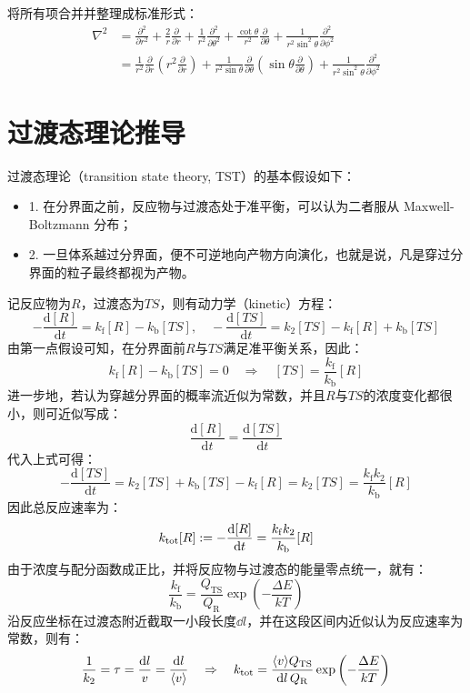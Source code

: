 将所有项合并并整理成标准形式：
\[\begin{aligned}
\nabla^2 &= \frac{\partial^2}{\partial r^2} + \frac{2}{r}\frac{\partial}{\partial r} + \frac{1}{r^2}\frac{\partial^2}{\partial\theta^2} + \frac{\cot\theta}{r^2}\frac{\partial}{\partial\theta} + \frac{1}{r^2\sin^2\theta}\frac{\partial^2}{\partial\phi^2}\\
&= \frac{1}{r^2}\frac{\partial}{\partial r}\left(r^2\frac{\partial}{\partial r}\right) + \frac{1}{r^2\sin\theta}\frac{\partial}{\partial\theta}\left(\sin\theta\frac{\partial}{\partial\theta}\right) + \frac{1}{r^2\sin^2\theta}\frac{\partial^2}{\partial\phi^2}
\end{aligned}\]

\newpage
\section{过渡态理论推导}\label{sec:tst}
过渡态理论（transition state theory, TST）的基本假设如下：
\begin{itemize}
    \item 1. 在分界面之前，反应物与过渡态处于准平衡，可以认为二者服从 Maxwell-Boltzmann 分布；
    \item 2. 一旦体系越过分界面，便不可逆地向产物方向演化，也就是说，凡是穿过分界面的粒子最终都视为产物。
\end{itemize}
记反应物为$R$，过渡态为$TS$，则有动力学（kinetic）方程：
\[-\frac{\mathrm{d} {[R]}}{\mathrm{d} t} = k_{\mathrm{f}}[R]-k_{\mathrm{b}}[TS], \quad -\frac{\mathrm{d} {[TS]}}{\mathrm{d} t} = k_2[TS]-k_{\mathrm{f}}[R]+k_{\mathrm{b}}[TS]\]
由第一点假设可知，在分界面前$R$与$TS$满足准平衡关系，因此：
\[k_{\mathrm{f}}[R]-k_{\mathrm{b}}[TS]=0 \quad \Rightarrow \quad [TS]=\frac{k_{\mathrm{f}}}{k_{\mathrm{b}}}[R]\]
进一步地，若认为穿越分界面的概率流近似为常数，并且$R$与$TS$的浓度变化都很小，则可近似写成：
\[\frac{\mathrm{d} {[R]}}{\mathrm{d} t} = \frac{\mathrm{d} {[TS]}}{\mathrm{d} t}\]
代入上式可得：
\[-\frac{\mathrm{d} {[TS]}}{\mathrm{d} t} = k_2[TS]+k_{\mathrm{b}}[TS]-k_{\mathrm{f}}[R]=k_2[TS]=\frac{k_{\mathrm{f}}k_2}{k_{\mathrm{b}}}[R]\]
因此总反应速率为：
\[k_{\rm tot}[R]:=-\frac{\mathrm{d} {[R]}}{\mathrm{d} t} = \frac{k_{\mathrm{f}}k_2}{k_{\mathrm{b}}}[R]\]
由于浓度与配分函数成正比，并将反应物与过渡态的能量零点统一，就有：
\[\frac{k_{\mathrm{f}}}{k_{\mathrm{b}}}= \frac{Q_{\mathrm{TS}}}{Q_{\mathrm{R}}} \exp\left(-\frac{\Delta E}{kT}\right)\]
沿反应坐标在过渡态附近截取一小段长度$\dd{l}$，并在这段区间内近似认为反应速率为常数，则有：
\[\frac{1}{k_2}= \tau = \frac{\dd{l}}{v} = \frac{\dd{l}}{\langle v \rangle} \quad \Rightarrow \quad k_{\rm tot}= \frac{\langle v \rangle Q_{\mathrm{TS}}}{\dd{l}Q_{\mathrm{R}}}\exp\left(-\frac{\Delta E}{kT}\right)\]

